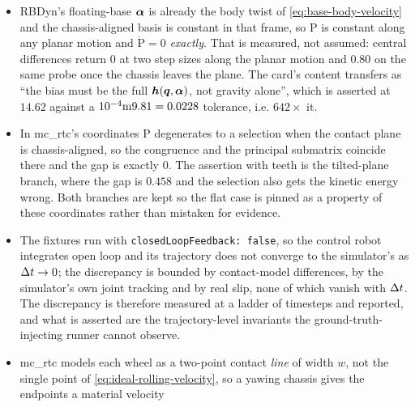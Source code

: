 \documentclass[10pt]{article}
\begin{document}
\begin{itemize}
    this codebase that produces an infinite bound is the documented
    \texttt{infTorque} option, an intentional escape hatch rather than a defect,
    so rejecting it would break a supported configuration. The rest of the
    rejection contract is asserted.
  \item {}
    RBDyn's floating-base $\boldsymbol{\alpha}$ is already the body twist of
    \eqref{eq:base-body-velocity} and the chassis-aligned basis is constant in
    that frame, so $\text{P}$ is constant along any planar motion and
    $\dot{\text{P}}=0$ \emph{exactly}. That is measured, not assumed: central
    differences return $0$ at two step sizes along the planar motion and $0.80$
    on the same probe once the chassis leaves the plane. The card's content
    transfers as ``the bias must be the full $\boldsymbol{h}(\boldsymbol{q},\boldsymbol{\alpha})$, not
    gravity alone'', which is asserted at $14.62$ against a
    $10^{-4}\mass\gravity[value]=0.0228$ tolerance, i.e. $642\times$ it.
  \item {}
    In mc\_rtc's coordinates $\text{P}$ degenerates to a selection when the
    contact plane is chassis-aligned, so the congruence and the principal
    submatrix coincide there and the gap is exactly $0$. The assertion with
    teeth is the tilted-plane branch, where the gap is $0.458$ and the selection
    also gets the kinetic energy wrong. Both branches are kept so the flat case
    is pinned as a property of these coordinates rather than mistaken for
    evidence.
  \item {}
    The fixtures run with \texttt{closedLoopFeedback: false}, so the control
    robot integrates open loop and its trajectory does not converge to the
    simulator's as $\Delta t\to0$; the discrepancy is bounded by
    contact-model differences, by the simulator's own joint tracking and by real
    slip, none of which vanish with $\Delta t$. The discrepancy is
    therefore measured at a ladder of timesteps and reported, and what is
    asserted are the trajectory-level invariants the ground-truth-injecting
    runner cannot observe.
  \item {} mc\_rtc models each wheel as a two-point contact \emph{line} of
    width $w$, not the single point of \eqref{eq:ideal-rolling-velocity}, so a
    yawing chassis gives the endpoints a material velocity

\end{itemize}
\end{document}
